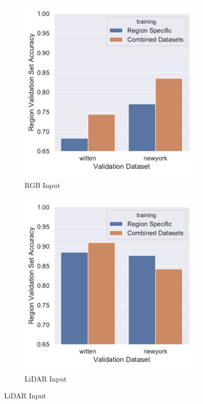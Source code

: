 \begin{figure}[h]
    \centering
    \begin{subfigure}[t]{0.45\columnwidth}
        \centering
        \includegraphics[width=0.99\textwidth]{chapter_4_roofshape/imgs/multi_data_set_rgb.pdf}
        \caption{RGB Input}
        \label{fig:rgb_multi_data}
    \end{subfigure}
    \hfill
    \begin{subfigure}[t]{0.45\columnwidth}
        \centering
        \includegraphics[width=0.99\textwidth]{chapter_4_roofshape/imgs/multi_data_set_lidar.pdf}
        \caption{LiDAR Input}
        \label{fig:lidar_multi_data}
    \end{subfigure}


\end{figure}
